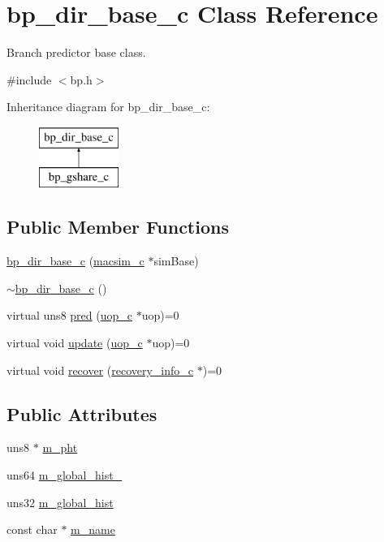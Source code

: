 \hypertarget{classbp__dir__base__c}{
\section{bp\_\-dir\_\-base\_\-c Class Reference}
\label{classbp__dir__base__c}
}


Branch predictor base class.  




{\ttfamily \#include $<$bp.h$>$}

Inheritance diagram for bp\_\-dir\_\-base\_\-c:\begin{figure}[H]
\begin{center}
\leavevmode
\includegraphics[height=2.000000cm]{classbp__dir__base__c}
\end{center}
\end{figure}
\subsection*{Public Member Functions}
\begin{DoxyCompactItemize}
\item 
\hyperlink{classbp__dir__base__c_ae4cc157dffc44cf03ebf700a0c782a14}{bp\_\-dir\_\-base\_\-c} (\hyperlink{classmacsim__c}{macsim\_\-c} $\ast$simBase)
\item 
\hyperlink{classbp__dir__base__c_a02585e74884b9018ece3dd244b76cc55}{$\sim$bp\_\-dir\_\-base\_\-c} ()
\item 
virtual uns8 \hyperlink{classbp__dir__base__c_a81c9f2b9e8f698581515a764d678bb66}{pred} (\hyperlink{classuop__c}{uop\_\-c} $\ast$uop)=0
\item 
virtual void \hyperlink{classbp__dir__base__c_aef86bf2af2a4ff7b19cbdab57032949f}{update} (\hyperlink{classuop__c}{uop\_\-c} $\ast$uop)=0
\item 
virtual void \hyperlink{classbp__dir__base__c_a9faee1854f637fa57be7094f4b2bc7b9}{recover} (\hyperlink{classrecovery__info__c}{recovery\_\-info\_\-c} $\ast$)=0
\end{DoxyCompactItemize}
\subsection*{Public Attributes}
\begin{DoxyCompactItemize}
\item 
uns8 $\ast$ \hyperlink{classbp__dir__base__c_a8b2a7a886fa7bd761f9ed85dc3d3eb30}{m\_\-pht}
\item 
uns64 \hyperlink{classbp__dir__base__c_a31b1491ed519c0f1b8387b5ac2d29a61}{m\_\-global\_\-hist\_}
\item 
uns32 \hyperlink{classbp__dir__base__c_ac955abfb388ed1d48ebc5eccc916310c}{m\_\-global\_\-hist}
\item 
const char $\ast$ \hyperlink{classbp__dir__base__c_a22d913a24f3144c33794b7440cf8d50c}{m\_\-name}
\end{DoxyCompactItemize}
